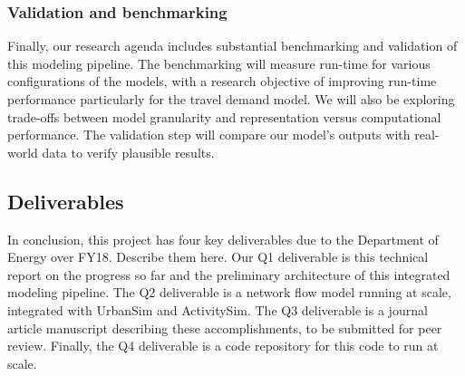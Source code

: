 \subsubsection{Validation and benchmarking}

Finally, our research agenda includes substantial benchmarking and validation of this modeling pipeline. The benchmarking will measure run-time for various configurations of the models, with a research objective of improving run-time performance particularly for the travel demand model. We will also be exploring trade-offs between model granularity and representation versus computational performance. The validation step will compare our model's outputs with real-world data to verify plausible results.

\subsection{Deliverables}
In conclusion, this project has four key deliverables due to the Department of Energy over FY18. Describe them here. Our Q1 deliverable is this technical report on the progress so far and the preliminary architecture of this integrated modeling pipeline. The Q2 deliverable is a network flow model running at scale, integrated with UrbanSim and ActivitySim. The Q3 deliverable is a journal article manuscript describing these accomplishments, to be submitted for peer review. Finally, the Q4 deliverable is a code repository for this code to run at scale.
